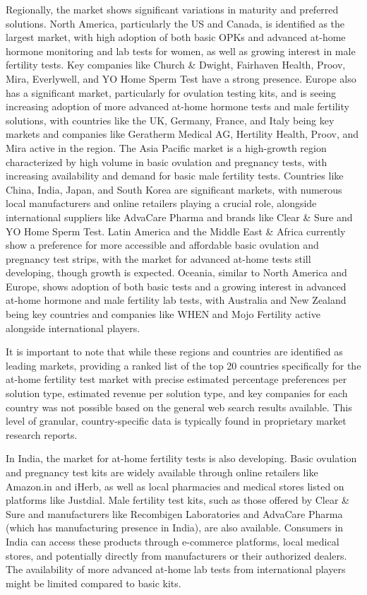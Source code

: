 \documentclass{article}
\begin{document}
Regionally, the market shows significant variations in maturity and preferred solutions. North America, particularly the US and Canada, is identified as the largest market, with high adoption of both basic OPKs and advanced at-home hormone monitoring and lab tests for women, as well as growing interest in male fertility tests. Key companies like Church \& Dwight, Fairhaven Health, Proov, Mira, Everlywell, and YO Home Sperm Test have a strong presence. Europe also has a significant market, particularly for ovulation testing kits, and is seeing increasing adoption of more advanced at-home hormone tests and male fertility solutions, with countries like the UK, Germany, France, and Italy being key markets and companies like Geratherm Medical AG, Hertility Health, Proov, and Mira active in the region. The Asia Pacific market is a high-growth region characterized by high volume in basic ovulation and pregnancy tests, with increasing availability and demand for basic male fertility tests. Countries like China, India, Japan, and South Korea are significant markets, with numerous local manufacturers and online retailers playing a crucial role, alongside international suppliers like AdvaCare Pharma and brands like Clear \& Sure and YO Home Sperm Test. Latin America and the Middle East & Africa currently show a preference for more accessible and affordable basic ovulation and pregnancy test strips, with the market for advanced at-home tests still developing, though growth is expected. Oceania, similar to North America and Europe, shows adoption of both basic tests and a growing interest in advanced at-home hormone and male fertility lab tests, with Australia and New Zealand being key countries and companies like WHEN and Mojo Fertility active alongside international players.

It is important to note that while these regions and countries are identified as leading markets, providing a ranked list of the top 20 countries specifically for the at-home fertility test market with precise estimated percentage preferences per solution type, estimated revenue per solution type, and key companies for each country was not possible based on the general web search results available. This level of granular, country-specific data is typically found in proprietary market research reports.

In India, the market for at-home fertility tests is also developing. Basic ovulation and pregnancy test kits are widely available through online retailers like Amazon.in and iHerb, as well as local pharmacies and medical stores listed on platforms like Justdial. Male fertility test kits, such as those offered by Clear \& Sure and manufacturers like Recombigen Laboratories and AdvaCare Pharma (which has manufacturing presence in India), are also available. Consumers in India can access these products through e-commerce platforms, local medical stores, and potentially directly from manufacturers or their authorized dealers. The availability of more advanced at-home lab tests from international players might be limited compared to basic kits.
\end{document}
